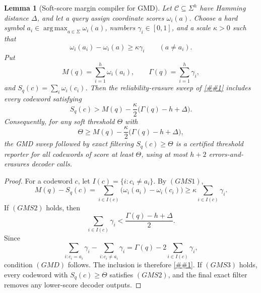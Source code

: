 \documentclass[10pt]{article}
\newcommand{\cref}[1]{\ref{##1}}
\newtheorem{lemma}[theorem]{Lemma}
\theoremstyle{definition}
\begin{document}
\begin{lemma}[Soft-score margin compiler for GMD]
   \label{lem:soft-score-gmd-margin}
   Let \(\mathcal C\subseteq\Sigma^h\) have Hamming distance \(\Delta\), and
   let a query assign coordinate scores \(\omega_i(a)\).  Choose a hard symbol
   \(a_i\in\operatorname*{arg\,max}_{a\in\Sigma}\omega_i(a)\), numbers
   \(\gamma_i\in[0,1]\), and a scale \(\kappa>0\) such that
   \[
      \omega_i(a_i)-\omega_i(a)\ge\kappa\gamma_i
      \qquad(a\ne a_i).
      \tag{GMS1}
   \]
   Put
   \[
      M(q)=\sum_{i=1}^h\omega_i(a_i),
      \qquad
      \Gamma(q)=\sum_{i=1}^h\gamma_i,
   \]
   and \(S_q(c)=\sum_i\omega_i(c_i)\).  Then the
   reliability-erasure sweep of
   \cref{lem:reliability-erasure-sweep} includes every codeword satisfying
   \[
      S_q(c)>
      M(q)-\frac{\kappa}{2}\bigl(\Gamma(q)-h+\Delta\bigr).
      \tag{GMS2}
   \]
   Consequently, for any soft threshold \(\Theta\) with
   \[
      \Theta\ge
      M(q)-\frac{\kappa}{2}\bigl(\Gamma(q)-h+\Delta\bigr),
      \tag{GMS3}
   \]
   the GMD sweep followed by exact filtering \(S_q(c)\ge\Theta\) is a
   certified threshold reporter for all codewords of score at least
   \(\Theta\), using at most \(h+2\) errors-and-erasures decoder calls.
\end{lemma}

\begin{proof}
   For a codeword \(c\), let \(I(c)=\{i:c_i\ne a_i\}\).  By \((GMS1)\),
   \[
      M(q)-S_q(c)
      =
      \sum_{i\in I(c)}
      \bigl(\omega_i(a_i)-\omega_i(c_i)\bigr)
      \ge
      \kappa\sum_{i\in I(c)}\gamma_i .
   \]
   If \((GMS2)\) holds, then
   \[
      \sum_{i\in I(c)}\gamma_i
      <
      \frac{\Gamma(q)-h+\Delta}{2}.
   \]
   Since
   \[
      \sum_{i:c_i=a_i}\gamma_i-\sum_{i:c_i\ne a_i}\gamma_i
      =
      \Gamma(q)-2\sum_{i\in I(c)}\gamma_i,
   \]
   condition \((GMD)\) follows.  The inclusion is therefore
   \cref{lem:reliability-erasure-sweep}.  If \((GMS3)\) holds, every codeword
   with \(S_q(c)\ge\Theta\) satisfies \((GMS2)\), and the final exact filter
   removes any lower-score decoder outputs.
\end{proof}
\end{document}

